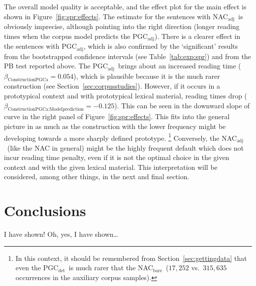 \documentclass[USenglish]{article}
\newcommand{\Sub}[1]{\ensuremath{\mathrm{_{#1}}}}
\newcommand{\NACb}{NAC\Sub{bare}}
\newcommand{\NACa}{NAC\Sub{adj}}
\newcommand{\PGCd}{PGC\Sub{det}}
\newcommand{\PGCa}{PGC\Sub{adj}}
\begin{document}
The overall model quality is acceptable, and the effect plot for the main effect is shown in Figure~\ref{fig:spr:effects}.
The estimate for the sentences with \NACa\ is obviously imprecise, although pointing into the right direction (longer reading times when the corpus model predicts the \PGCa).
There is a clearer effect in the sentences with \PGCa, which is also confirmed by the `significant' results from the bootstrapped confidence intervals (see Table~\ref{tab:exp:spr}) and from the PB test reported above.
The \PGCa\ brings about an increased reading time ($\beta_{\text{ConstructionPGCa}}=0.054$), which is plausible because it is the much rarer construction (see Section~\ref{sec:corpusstudies}).
However, if it occurs in a prototypical context and with prototypical lexical material, reading times drop ($\beta_{\text{ConstructionPGCa:Modelprediction}}=-0.125$).
This can be seen in the downward slope of curve in the right panel of Figure~\ref{fig:spr:effects}.
This fits into the general picture in as much as the construction with the lower frequency might be developing towards a more sharply defined prototype.%
\footnote{In this context, it should be remembered from Section~\ref{sec:gettingdata} that even the \PGCd\ is much rarer that the \NACb\ ($17,252$ vs.\ $315,635$ occurrences in the auxiliary corpus samples).}
Conversely, the \NACa\ (like the NAC in general) might be the highly frequent default which does not incur reading time penalty, even if it is not the optimal choice in the given context and with the given lexical material.
This interpretation will be considered, among other things, in the next and final section.




\section{Conclusions}
\label{sec:conclusion}

I have shown!
Oh, yes, I have shown\ldots



\end{document}
